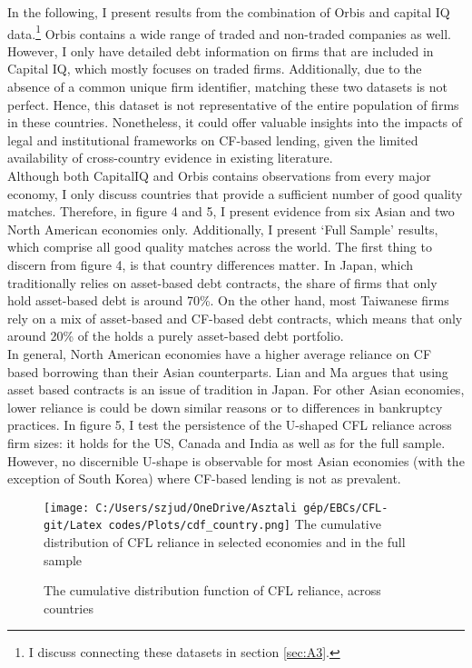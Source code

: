 \documentclass[12pt]{article}
\begin{document}
In the following, I present results from the combination of Orbis and capital IQ data.\footnote{I discuss connecting these datasets in section \ref{sec:A3}.} Orbis contains a wide range of traded and non-traded companies as well. However, I only have detailed debt information on firms that are included in Capital IQ, which mostly focuses on traded firms. Additionally, due to the absence of a common unique firm identifier, matching these two datasets is not perfect. Hence, this dataset is not representative of the entire population of firms in these countries. Nonetheless, it could offer valuable insights into the impacts of legal and institutional frameworks on CF-based lending, given the limited availability of cross-country evidence in existing literature. \vspace{3mm} \\
Although both CapitalIQ and Orbis contains observations from every major economy, I only discuss countries that provide a sufficient number of good quality matches. Therefore, in figure 4 and 5, I present evidence from six Asian and two North American economies only. Additionally, I present `Full Sample' results, which comprise all good quality matches across the world. The first thing to discern from figure 4, is that country differences matter. In Japan, which traditionally relies on asset-based debt contracts, the share of firms that only hold asset-based debt is around 70\%. On the other hand, most Taiwanese firms rely on a mix of asset-based and CF-based debt contracts, which means that only around 20\% of the holds a purely asset-based debt portfolio. \vspace{3mm} \\
In general, North American economies have a higher average reliance on CF based borrowing than their Asian counterparts. Lian and Ma argues that using asset based contracts is an issue of tradition in Japan. For other Asian economies, lower reliance is could be down similar reasons or to differences in bankruptcy practices. In figure 5, I test the persistence of the U-shaped CFL reliance across firm sizes: it holds for the US, Canada and India as well as for the full sample. However, no discernible U-shape is observable for most Asian economies (with the exception of South Korea) where CF-based lending is not as prevalent.

\begin{figure}[H]  %
    \centering
    \caption{The cumulative distribution function of CFL reliance, across countries} \label{chart:orb1}
    \texttt{[image: C:/Users/szjud/OneDrive/Asztali gép/EBCs/CFL-git/Latex codes/Plots/cdf\_country.png]}
    \small The cumulative distribution of CFL reliance in selected economies and in the full sample
\end{figure}
\end{document}

